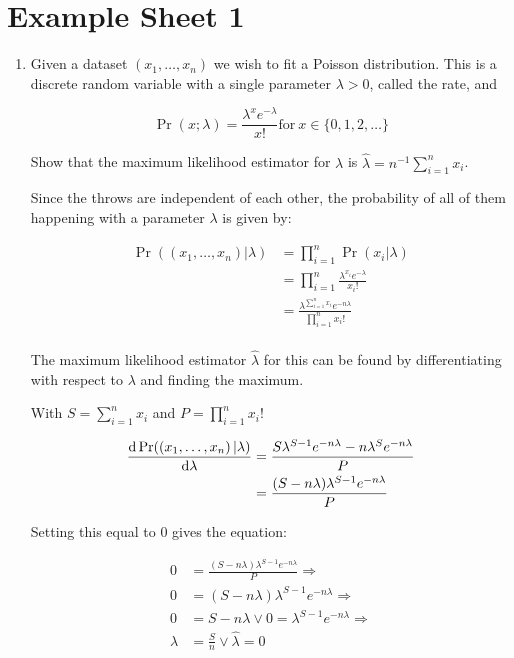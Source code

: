 \documentclass[10pt,\jkfside,a4paper]{article}
\begin{document}
\section{Example Sheet 1}

\begin{enumerate}

\item Given a dataset $\left(x_1,\ldots, x_n\right)$ we wish to fit a Poisson
distribution. This is a discrete random variable with a single parameter
$\lambda > 0$, called the rate, and

\[
\Pr\left( x ; \lambda \right) = \frac{\lambda^x e^{-\lambda}}{x!} \text{for}
 \ x \in\{0, 1, 2, \dots \}
\]

Show that the maximum likelihood estimator for $\lambda$ is $\hat{\lambda} =
n^{-1} \sum^{n}_{i=1} x_i$.

Since the throws are independent of each other, the probability of all of
them happening with a parameter $\lambda$ is given by:

\[
\begin{split}
\Pr(\left( x_1,\ldots, x_n \right) | \lambda) &= \prod^n_{i=1} \Pr(x_i |
\lambda) \\
&= \prod^n_{i=1} \frac{\lambda^{x_i}e^{-\lambda}}{x_i!} \\
&= \frac{\lambda^{\sum^{n}_{i=1} x_i}e^{-n\lambda}}{\prod^n_{i=1} x_i!} \\
\end{split}
\]

The maximum likelihood estimator $\hat{\lambda}$ for this can be found by
differentiating with respect to $\lambda$ and finding the maximum.

With $S = \sum^{n}_{i=1}x_i  $ and $P = \prod^n_{i=1} x_i! $

\[
\begin{split}
\dv{\Pr(\left( x_1,\ldots, x_n \right) | \lambda)}{\lambda}
&=
\frac{S \lambda^{S-1}e^{-n\lambda} - n\lambda^S e^{-n\lambda}}{P} \\
&=
\frac{(S - n\lambda)\lambda^{S-1}e^{-n\lambda}}{P} \\
\end{split}
\]

Setting this equal to 0 gives the equation:

\[
\begin{split}
0 &=
\frac{(S - n\lambda)\lambda^{S-1}e^{-n\lambda}}{P} \Longrightarrow \\
0 &= (S - n\lambda)\lambda^{S-1}e^{-n\lambda} \Longrightarrow \\
0 &= S - n\lambda \vee 0 = \lambda^{S-1}e^{-n\lambda} \Longrightarrow \\
\lambda &= \frac{S}{n} \vee \hat{\lambda} = 0 \\
\end{split}
\]


\end{enumerate}
\end{document}
